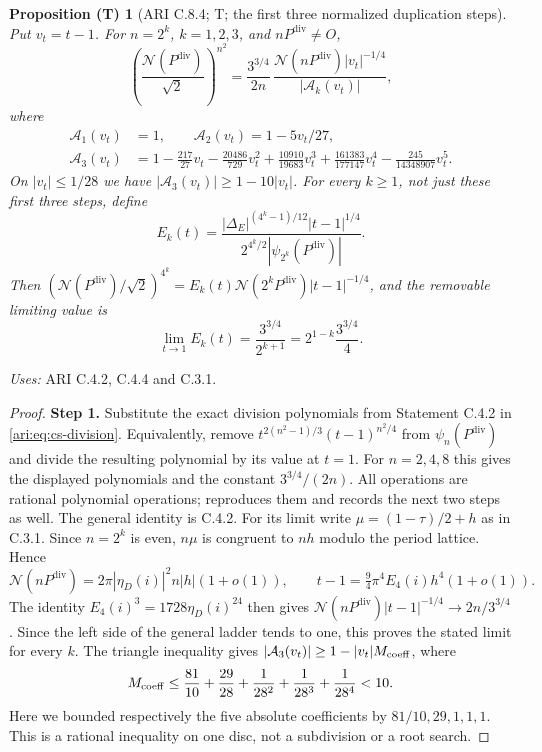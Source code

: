 \documentclass[11pt,a4paper]{article}
\theoremstyle{plain}
\newtheorem{proposition}[theorem]{Proposition (T)}
\theoremstyle{definition}
\begin{document}
\begin{proposition}[ARI C.8.4; T; the first three normalized duplication steps]\label{ari:C.8.4}
Put $v_t=t-1$. For $n=2^k$, $k=1,2,3$, and $nP^{\mathrm{div}}\ne O$,
\begin{equation}\label{ari:eq:ca-ladder}
 \left(\frac{\mathcal N(P^{\mathrm{div}})}{\sqrt2}\right)^{n^2}
 =\frac{3^{3/4}}{2n}\,
       \frac{\mathcal N(nP^{\mathrm{div}})|v_t|^{-1/4}}{|\mathcal A_k(v_t)|},
\end{equation}
where
\begin{align*}
 \mathcal A_1(v_t)&=1,\qquad \mathcal A_2(v_t)=1-5v_t/27,\\
 \mathcal A_3(v_t)&=1-\frac{217}{27}v_t-\frac{20486}{729}v_t^2
       +\frac{10910}{19683}v_t^3
       +\frac{161383}{177147}v_t^4
       -\frac{245}{14348907}v_t^5.
\end{align*}
On $|v_t|\le1/28$ we have $|\mathcal A_3(v_t)|\ge1-10|v_t|$.
For every $k\ge1$, not just these first three steps, define
\[
 E_k(t)=\frac{|\Delta_E|^{(4^k-1)/12}|t-1|^{1/4}}
 {2^{4^k/2}|\psi_{2^k}(P^{\mathrm{div}})|}.
\]
Then $(\mathcal N(P^{\mathrm{div}})/\sqrt2)^{4^k}=E_k(t)\mathcal N(2^kP^{\mathrm{div}})|t-1|^{-1/4}$,
and the removable limiting value is
\[
 \lim_{t\to1}E_k(t)=\frac{3^{3/4}}{2^{k+1}}
                 =2^{1-k}\frac{3^{3/4}}4.
\]
\end{proposition}
\noindent\textit{Uses:} ARI C.4.2, C.4.4 and C.3.1.\par
\begin{proof}
\noindent\textbf{Step 1.} Substitute the exact division polynomials from Statement C.4.2
in \eqref{ari:eq:cs-division}. Equivalently, remove
$t^{2(n^2-1)/3}(t-1)^{n^2/4}$ from $\psi_n(P^{\mathrm{div}})$ and divide
the resulting polynomial by its value at $t=1$. For $n=2,4,8$
this gives the displayed polynomials and the constant
$3^{3/4}/(2n)$. All operations are rational polynomial operations;
 reproduces them and records
the next two steps as well. The general identity is C.4.2.
For its limit write $\mu=(1-\tau)/2+h$ as in C.3.1. Since
$n=2^k$ is even, $n\mu$ is congruent to $nh$ modulo the
period lattice. Hence
\[
 \mathcal N(nP^{\mathrm{div}})=2\pi|\eta_D(i)|^2 n|h|(1+o(1)),\qquad
 t-1=\tfrac94\pi^4E_4(i)h^4(1+o(1)).
\]
The identity $E_4(i)^3=1728\eta_D(i)^{24}$ then gives
$\mathcal N(nP^{\mathrm{div}})|t-1|^{-1/4}\to2n/3^{3/4}$.
Since the left side of the general ladder tends to one,
this proves the stated limit for every $k$.
The triangle inequality gives
$|\mathcal A_3(v_t)|\ge1-|v_t|M_{\rm coeff}$, where
\[
 M_{\rm coeff}\le\frac{81}{10}+\frac{29}{28}
                +\frac1{28^2}+\frac1{28^3}+\frac1{28^4}<10.
\]
Here we bounded respectively the five absolute coefficients by
$81/10,29,1,1,1$. This is a rational inequality on one disc,
not a subdivision or a root search.
\end{proof}
\end{document}
